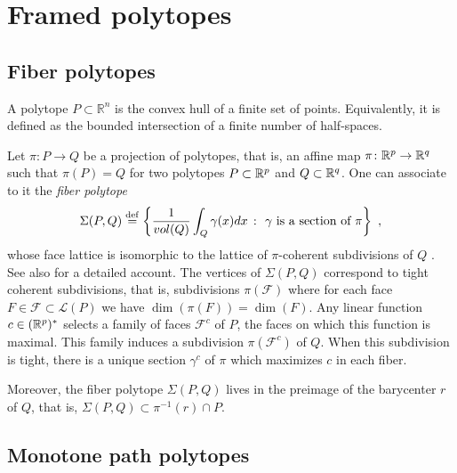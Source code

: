
\section{Framed polytopes}


\subsection{Fiber polytopes}

A polytope $P \subset \mathbb{R}^n$ is the convex hull of a finite set of points.
Equivalently, it is defined as the bounded intersection of a finite number of half-spaces.

Let $\pi \colon P \to Q$ be a projection of polytopes, that is, an affine map $\pi \colon \mathbb{R}^p \to \mathbb{R}^q$ such that $\pi(P)=Q$ for two polytopes $P\subset \mathbb{R}^p$ and $Q \subset \mathbb{R}^q$.
One can associate to it the \emph{fiber polytope} \[\Sigma(P,Q) \stackrel{\mathrm{def}}{=} \left\{ \frac{1}{vol(Q)}\int_Q \gamma(x)dx \ \colon \ \gamma \text{ is a section of }\pi \right\} \ , \] whose face lattice is isomorphic to the lattice of $\pi$-coherent subdivisions of $Q$ \cite{BilleraSturmfels92}.
See also \cite[Chapter 9]{Ziegler95} for a detailed account.
The vertices of $\Sigma(P,Q)$ correspond to tight coherent subdivisions, that is, subdivisions $\pi(\mathcal{F})$ where for each face $F \in \mathcal{F}\subset\mathcal{L}(P)$ we have $\dim(\pi(F))=\dim(F)$.
Any linear function $c\in (\mathbb{R}^p)^{*}$ selects a family of faces $\mathcal{F}^c$ of $P$, the faces on which this function is maximal. 
This family induces a subdivision $\pi(\mathcal{F}^c)$ of $Q$.
When this subdivision is tight, there is a unique section $\gamma^c$ of $\pi$ which maximizes $c$ in each fiber.

Moreover, the fiber polytope $\Sigma(P,Q)$ lives in the preimage of the barycenter $r$ of $Q$, that is, $\Sigma(P,Q)\subset\pi^{-1}(r)\cap P$.

\subsection{Monotone path polytopes}

